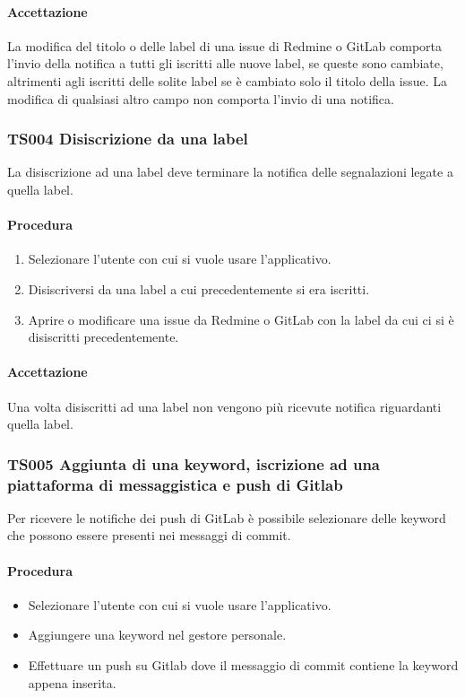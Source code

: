 		\paragraph*{Accettazione}
		La modifica del titolo o delle label di una issue di Redmine o GitLab comporta l'invio della notifica a tutti gli iscritti alle nuove label, se queste sono cambiate, altrimenti agli iscritti delle solite label se è cambiato solo il titolo della issue. La modifica di qualsiasi altro campo non comporta l'invio di una notifica.
		
	\subsubsection{TS004 Disiscrizione da una label}
		La disiscrizione ad una label deve terminare la notifica delle segnalazioni legate a quella label.
		
		\paragraph*{Procedura}
			\begin{enumerate}
				\item Selezionare l'utente con cui si vuole usare l'applicativo.
				\item Disiscriversi da una label a cui precedentemente si era iscritti.
				\item Aprire o modificare una issue da Redmine o GitLab con la label da cui ci si è disiscritti precedentemente.
			\end{enumerate}
		
		\paragraph*{Accettazione}
		Una volta disiscritti ad una label non vengono più ricevute notifica riguardanti quella label.
		
	\subsubsection{TS005 Aggiunta di una keyword, iscrizione ad una piattaforma di messaggistica e push di Gitlab}
		Per ricevere le notifiche dei push di GitLab è possibile selezionare delle keyword che possono essere presenti nei messaggi di commit.
		
		\paragraph*{Procedura}
		\begin{itemize}
			\item Selezionare l'utente con cui si vuole usare l'applicativo.
			\item Aggiungere una keyword nel gestore personale.
			\item Effettuare un push su Gitlab dove il messaggio di commit contiene la keyword appena inserita.
		\end{itemize}
	

